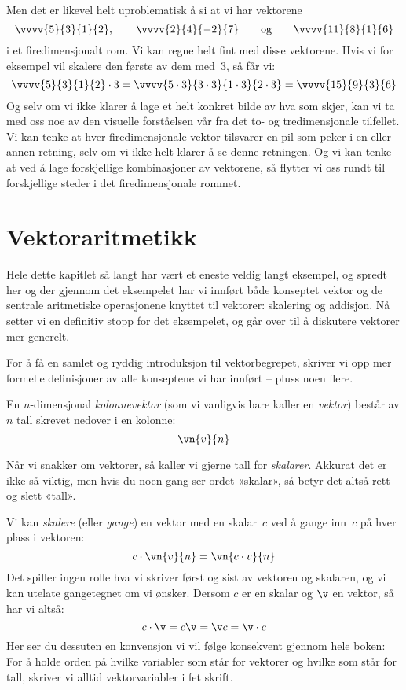 Men det er likevel helt uproblematisk å si at vi har vektorene
\[
\vvvv{5}{3}{1}{2},\qquad
\vvvv{2}{4}{-2}{7}\qquad\text{og}\qquad
\vvvv{11}{8}{1}{6}
\]
i et firedimensjonalt rom.  Vi kan regne helt fint med disse
vektorene.  Hvis vi for eksempel vil skalere den første av dem
med~$3$, så får vi:
\[
\vvvv{5}{3}{1}{2} \cdot 3
= \vvvv{5 \cdot 3}{3 \cdot 3}{1 \cdot 3}{2 \cdot 3}
= \vvvv{15}{9}{3}{6}
\]
Og selv om vi ikke klarer å lage et helt konkret bilde av hva som
skjer, kan vi ta med oss noe av den visuelle forståelsen vår fra det
to- og tredimensjonale tilfellet.  Vi kan tenke at hver
firedimensjonale vektor tilsvarer en pil som peker i en eller annen
retning, selv om vi ikke helt klarer å se denne retningen.  Og vi kan
tenke at ved å lage forskjellige kombinasjoner av vektorene, så
flytter vi oss rundt til forskjellige steder i det firedimensjonale
rommet.


\section*{Vektoraritmetikk}

Hele dette kapitlet så langt har vært et eneste veldig langt eksempel,
og spredt her og der gjennom det eksempelet har vi innført både
konseptet vektor og de sentrale aritmetiske operasjonene knyttet til
vektorer: skalering og addisjon.  Nå setter vi en definitiv stopp for
det eksempelet, og går over til å diskutere vektorer mer generelt.

For å få en samlet og ryddig introduksjon til vektorbegrepet, skriver
vi opp mer formelle definisjoner av alle konseptene vi har innført --
pluss noen flere.

En $n$-dimensjonal \emph{kolonnevektor} (som vi vanligvis bare kaller
en \emph{vektor}) består av $n$ tall skrevet nedover i en kolonne:
\[
\vn{v}{n}
\]

Når vi snakker om vektorer, så kaller vi gjerne tall for
\emph{skalarer}.  Akkurat det er ikke så viktig, men hvis du noen gang
ser ordet «skalar», så betyr det altså rett og slett «tall».

Vi kan \emph{skalere} (eller \emph{gange}) en vektor med en skalar~$c$
ved å gange inn~$c$ på hver plass i vektoren:
\[
c \cdot \vn{v}{n} = \vn{c \cdot v}{n}
\]
Det spiller ingen rolle hva vi skriver først og sist av vektoren og
skalaren, og vi kan utelate gangetegnet om vi ønsker.  Dersom $c$ er
en skalar og $\v$ en vektor, så har vi altså:
\[
c \cdot \v = c \v = \v c = \v \cdot c
\]
Her ser du dessuten en konvensjon vi vil følge konsekvent gjennom hele
boken: For å holde orden på hvilke variabler som står for vektorer og
hvilke som står for tall, skriver vi alltid vektorvariabler i fet
skrift.


